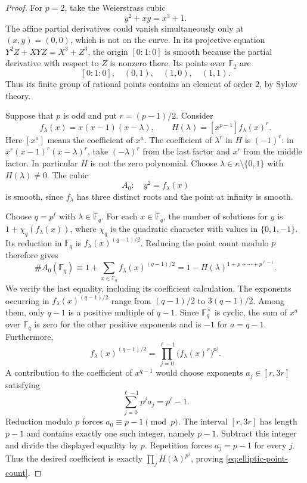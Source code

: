 \begin{proof}
For $p=2$, take the Weierstrass cubic
\[
                     y^2+xy=x^3+1.
\]
The affine partial derivatives could vanish simultaneously only at
$(x,y)=(0,0)$, which is not on the curve.  In its projective equation
$Y^2Z+XYZ=X^3+Z^3$, the origin $[0:1:0]$ is smooth because the partial
derivative with respect to $Z$ is nonzero there.  Its points over
$\mathbb F_2$ are
\[
              [0:1:0],\quad (0,1),\quad (1,0),\quad (1,1).
\]
Thus its finite group of rational points contains an element of order
$2$, by Sylow theory.

Suppose that $p$ is odd and put $r=(p-1)/2$.  Consider
\[
 f_\lambda(x)=x(x-1)(x-\lambda),\qquad
 H(\lambda)=[x^{p-1}]f_\lambda(x)^r.
\]
Here $[x^a]$ means the coefficient of $x^a$.  The coefficient of
$\lambda^r$ in $H$ is $(-1)^r$: in
$x^r(x-1)^r(x-\lambda)^r$, take $(-\lambda)^r$ from the last factor
and $x^r$ from the middle factor.  In particular $H$ is not the zero
polynomial.  Choose $\lambda\in\kappa\setminus\{0,1\}$ with
$H(\lambda)\ne0$.  The cubic
\[
                         A_0:\quad y^2=f_\lambda(x)
\]
is smooth, since $f_\lambda$ has three distinct roots and the point at
infinity is smooth.

Choose $q=p^\ell$ with $\lambda\in\mathbb F_q$.  For each
$x\in\mathbb F_q$, the number of solutions for $y$ is
$1+\chi_q(f_\lambda(x))$, where $\chi_q$ is the quadratic character
with values in $\{0,1,-1\}$.  Its reduction in $\mathbb F_q$ is
$f_\lambda(x)^{(q-1)/2}$.  Reducing the point count modulo $p$
therefore gives
\begin{equation}\label{eq:elliptic-point-count}
 \#A_0(\mathbb F_q)
 \equiv 1+\sum_{x\in\mathbb F_q}f_\lambda(x)^{(q-1)/2}
 =1-H(\lambda)^{1+p+\cdots+p^{\ell-1}}.
\end{equation}
We verify the last equality, including its coefficient calculation.
The exponents occurring in $f_\lambda(x)^{(q-1)/2}$ range from
$(q-1)/2$ to $3(q-1)/2$.  Among them, only $q-1$ is a positive
multiple of $q-1$.  Since $\mathbb F_q^\times$ is cyclic, the sum of
$x^a$ over $\mathbb F_q$ is zero for the other positive exponents and
is $-1$ for $a=q-1$.
Furthermore,
\[
 f_\lambda(x)^{(q-1)/2}
       =\prod_{j=0}^{\ell-1}\bigl(f_\lambda(x)^r\bigr)^{p^j}.
\]
A contribution to the coefficient of $x^{q-1}$ would choose exponents
$a_j\in[r,3r]$ satisfying
\[
                   \sum_{j=0}^{\ell-1}p^j a_j=p^\ell-1.
\]
Reduction modulo $p$ forces $a_0\equiv p-1\pmod p$.  The interval
$[r,3r]$ has length $p-1$ and contains exactly one such integer,
namely $p-1$.  Subtract this integer and divide the displayed equality
by $p$.  Repetition forces $a_j=p-1$ for every $j$.  Thus the desired
coefficient is exactly
$\prod_jH(\lambda)^{p^j}$, proving
\eqref{eq:elliptic-point-count}.


\end{proof}
